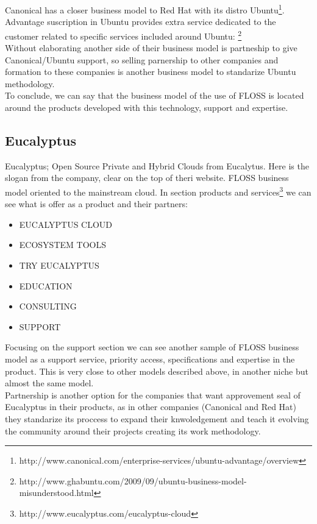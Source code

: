 \documentclass[11pt]{scrartcl}
\begin{document}
 Canonical has a closer business model to Red Hat with its distro Ubuntu\footnote{http://www.canonical.com/enterprise-services/ubuntu-advantage/overview}.
 Advantage suscription in Ubuntu provides extra service dedicated to the customer 
 related to specific services included around Ubuntu:
 \footnote{http://www.ghabuntu.com/2009/09/ubuntu-business-model-misunderstood.html}\\
 Without elaborating another side of their business model is partneship to give
 Canonical/Ubuntu support, so selling parnership to other companies and formation
 to these companies is another business model to standarize Ubuntu methodology.\\
 To conclude, we can say that the business model of the use of FLOSS is located
  around the products developed with this technology, support and expertise.
 
\subsection{Eucalyptus}

 Eucalyptus; Open Source Private and Hybrid Clouds from Eucalytus. Here is the 
 slogan from the company, clear on the top of theri website. FLOSS business model
 oriented to the mainstream cloud.
 In section products and services\footnote{http://www.eucalyptus.com/eucalyptus-cloud} 
 we can see what is offer as a product and their partners:
 \begin{itemize}
  \item EUCALYPTUS CLOUD
  \item ECOSYSTEM TOOLS
  \item TRY EUCALYPTUS
  \item EDUCATION
  \item CONSULTING
  \item SUPPORT
\end{itemize}
 Focusing on the support section we can see another sample of FLOSS business model
 as a support service, priority access, specifications and expertise in the product.
 This is very close to other models described above, in another niche but almost the same
 model.\\
 Partnership is another option for the companies that want approvement seal of 
 Eucalyptus in their products, as in other companies (Canonical and Red Hat) they 
 standarize its proccess to expand their knwoledgement and teach it evolving the
  community around their projects creating its work methodology.
 
\end{document}
